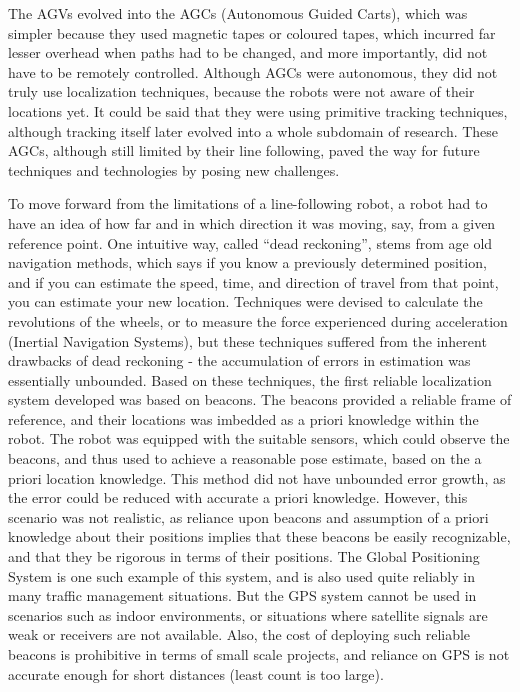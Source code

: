 The AGVs evolved into the AGCs (Autonomous Guided Carts), which was simpler because they used magnetic tapes or coloured tapes, which incurred
far lesser overhead when paths had to be changed, and more importantly, did not have to be remotely controlled. Although AGCs were autonomous,
they did not truly use localization techniques, because the robots were not aware of their locations yet. It could be said that they were using 
primitive tracking techniques, although tracking itself later evolved into a whole subdomain of research. These AGCs, although still
limited by their line following, paved the way for future techniques and technologies by posing new challenges.

To move forward from the limitations of a line-following robot, a robot had to have an idea of how far and in which direction it was moving, 
say, from a given reference point. One intuitive way, called ``dead reckoning'', stems from age old navigation methods, which says if you know
a previously determined position, and if you can estimate the speed, time, and direction of travel from that point, you can estimate your new
location. Techniques were devised to calculate the revolutions of the wheels, or to measure the force experienced during acceleration
(Inertial Navigation Systems), but these techniques suffered from the inherent drawbacks of dead reckoning - the accumulation of errors in
estimation was essentially unbounded. Based on these techniques, the first reliable localization system developed was based on beacons.
The beacons provided a reliable frame of reference, and their locations was imbedded as a priori knowledge within the robot. The robot was 
equipped with the suitable sensors, which could observe the beacons, and thus used to achieve a reasonable pose estimate,
based on the a priori location knowledge. This method did not have unbounded error growth, as the error could be reduced with accurate
a priori knowledge. However, this scenario was not realistic, as reliance upon beacons and assumption of a priori knowledge about their
positions implies that these beacons be easily recognizable, and that they be rigorous in terms of their positions. The Global Positioning
System is one such example of this system, and is also used quite reliably in many traffic management situations. But the GPS system cannot be
used in scenarios such as indoor environments, or situations where satellite signals are weak or receivers are not available. Also, the cost of 
deploying such reliable beacons is prohibitive in terms of small scale projects, and reliance on GPS is not accurate enough for short distances
(least count is too large).

